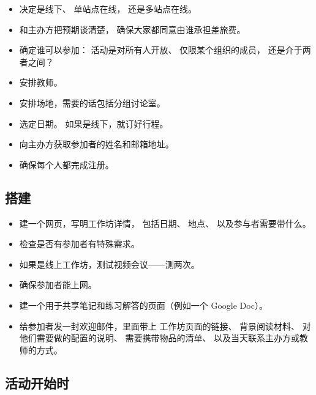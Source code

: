 \begin{itemize}

\item
  决定是线下、
  单站点在线，
  还是多站点在线。

\item
  和主办方把预期谈清楚，
  确保大家都同意由谁承担差旅费。

\item
  确定谁可以参加：
  活动是对所有人开放、
  仅限某个组织的成员，
  还是介于两者之间？

\item
  安排教师。

\item
  安排场地，需要的话包括分组讨论室。

\item
  选定日期。
  如果是线下，就订好行程。

\item
  向主办方获取参加者的姓名和邮箱地址。

\item
  确保每个人都完成注册。

\end{itemize}

\subsection*{搭建}

\begin{itemize}

\item
  建一个网页，写明工作坊详情，
  包括日期、
  地点、
  以及参与者需要带什么。

\item
  检查是否有参加者有特殊需求。

\item
  如果是线上工作坊，测试视频会议——测两次。

\item
  确保参加者能上网。

\item
  建一个用于共享笔记和练习解答的页面（例如一个 Google Doc）。

\item
  给参加者发一封欢迎邮件，里面带上
  工作坊页面的链接、
  背景阅读材料、
  对他们需要做的配置的说明、
  需要携带物品的清单、
  以及当天联系主办方或教师的方式。

\end{itemize}

\subsection*{活动开始时}

